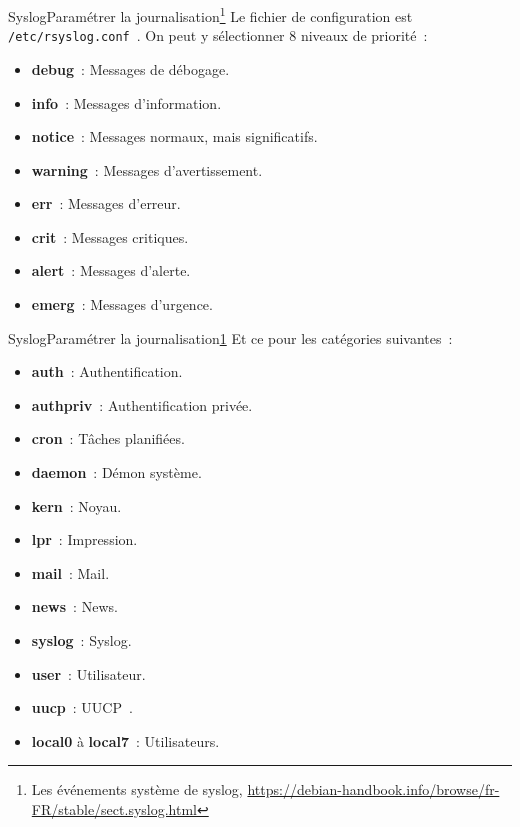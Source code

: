 \documentclass{beamer}
\begin{document}
    \begin{frame}{Syslog}{Paramétrer la journalisation\footnote{\label{syslog}Les événements système de syslog, \url{https://debian-handbook.info/browse/fr-FR/stable/sect.syslog.html}}}
        Le fichier de configuration est \lstinline{/etc/rsyslog.conf}~.
        \bigbreak
        On peut y sélectionner 8 niveaux de priorité~:
        \begin{itemize}
            \item \textbf{debug}~: Messages de débogage.
            \item \textbf{info}~: Messages d'information.
            \item \textbf{notice}~: Messages normaux, mais significatifs.
            \item \textbf{warning}~: Messages d'avertissement.
            \item \textbf{err}~: Messages d'erreur.
            \item \textbf{crit}~: Messages critiques.
            \item \textbf{alert}~: Messages d'alerte.
            \item \textbf{emerg}~: Messages d'urgence.
        \end{itemize}
    \end{frame}

    \begin{frame}{Syslog}{Paramétrer la journalisation\cref{syslog}}
        Et ce pour les catégories suivantes~:
        \begin{itemize}
            \item \textbf{auth}~: Authentification.
            \item \textbf{authpriv}~: Authentification privée.
            \item \textbf{cron}~: Tâches planifiées.
            \item \textbf{daemon}~: Démon système.
            \item \textbf{kern}~: Noyau.
            \item \textbf{lpr}~: Impression.
            \item \textbf{mail}~: Mail.
            \item \textbf{news}~: News.
            \item \textbf{syslog}~: Syslog.
            \item \textbf{user}~: Utilisateur.
            \item \textbf{uucp}~: UUCP~.
            \item \textbf{local0} à \textbf{local7}~: Utilisateurs.
        \end{itemize}
    \end{frame}
\end{document}
